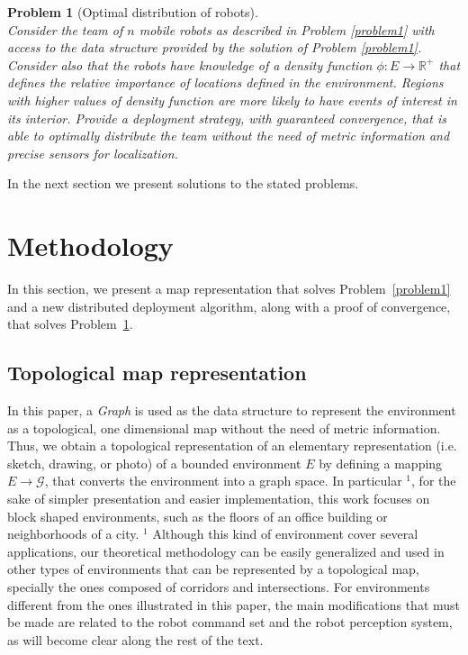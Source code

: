 \documentclass[smallcondensed]{svjour3}
\newtheorem{myprob}{Problem}
\begin{document}
\begin{myprob}[Optimal distribution of robots]
\label{Prob:deployment}
%
\textnormal{\\
%
Consider the team of $n$ mobile robots as described in Problem \ref{problem1} with access to the data structure provided by the solution of Problem \ref{problem1}. Consider also that the robots have knowledge of a density function $\phi:E \rightarrow \mathbb{R}^+$ that defines the relative importance of locations defined in the environment. Regions with higher values of density function are more likely to have events of interest in its interior. \textit{Provide a deployment strategy, with guaranteed convergence, that is able to optimally distribute the team without the need of metric information and precise sensors for localization.}
}
\end{myprob}

In the next section we present solutions
to the stated problems.


\section{Methodology}
\label{sec:methodology}

In this section, we present a map representation that solves Problem~\ref{problem1} and a new distributed deployment algorithm, along with a proof of convergence, that solves Problem~\ref{Prob:deployment}.

\subsection{Topological map representation}
\label{sec:topologymap}

In this paper, a \textit{Graph} is used as the data structure to represent the environment as a topological, one dimensional map without the need of metric information. Thus, we obtain a topological representation of an elementary representation (i.e. sketch, drawing, or photo) of a bounded environment $E$ by defining a mapping $E \rightarrow \mathcal{G}$, that converts the environment into a graph space. In particular {\color{blue} $^1$, for the sake of simpler presentation and easier implementation,}  this work focuses on block shaped environments, such as the floors of an office building or neighborhoods of a city.{\color{blue} $^1$ Although this kind of environment cover several applications, our theoretical methodology can be easily generalized and used in other types of environments that can be represented by a topological map, specially the ones composed of corridors and intersections. For environments different from the ones illustrated in this paper, the main modifications that must be made are related to the robot command set and the robot perception system, as will become clear along the rest of the text. }
%
\end{document}

